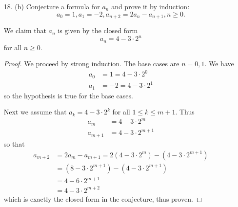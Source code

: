 \documentclass{article}
\begin{document}
\begin{itemize}
\begin{proof}
		\end{proof}

		(b) Show that \[\binom{n}{0} - \binom{n}{1} + \binom{n}{2} - \cdots \pm \binom{n}{n} = 0\] if $n>0.$ 
		\begin{proof}
			We proceed by induction. The base case is $n=1.$ In this case, $\binom{1}{0}-\binom{1}{1}=0$ thus the statement is true for $n=1.$

			Next, assume the hypothesis is true for arbitrary $k\in\NN,$ so that \[0=\sum_{i=1}^k (-1)^i\binom{k}{i}.\] Consider the sums
			\begin{align*}
				S_{k+1} = \sum_{i=0}^{k+1}(-1)^i \binom{k+1}{i} &= \binom{k+1}{0} - \binom{k+1}{1} + \cdots \pm\binom{k+1}{k}\mp\binom{k+1}{k+1} \\
				S_k = \sum_{i=0}^k (-1)^i \binom{k+0}{i} &= \binom{k+0}{0} - \binom{k+0}{1} + \cdots \pm\binom{k+0}{k}
			\end{align*}
			Then 
			\begin{align*}
				S_{k+1} - S_k &= \mp\binom{k+1}{k+1} + \sum_{i=1}^k (-1)^i \binom{k}{i-1} \\
				&= \mp\binom{k}{k}-\sum_{j=0}^{k-1}(-1)^j\binom{k}{j} \\
				&= -\left( \sum_{j=0}^k (-1)^j \binom{k}{j} \right) \\
				&= 0
			\end{align*} so $S_{k+1}=S_k=0,$ completing the proof. 
			
		\end{proof}

	\item[18.] (b) Conjecture a formula for $a_n$ and prove it by induction: \[a_0 = 1, a_1 = -2, a_{n+2} = 2a_n - a_{n+1}, n\ge 0.\]
		\begin{conjecture}
			We claim that $a_n$ is given by the closed form \[a_n=4-3\cdot2^n\] for all $n\ge0.$
		\end{conjecture}

		\begin{proof}
			We proceed by strong induction. The base cases are $n=0, 1.$ We have 
			\begin{align*}
				a_0 &= 1 = 4 - 3\cdot2^0 \\
				a_1 &= -2 = 4 - 3\cdot 2^1
			\end{align*} so the hypothesis is true for the base cases.

			Next we assume that $a_k = 4 - 3\cdot 2^k$ for all $1\le k\le m + 1.$ Thus 
			\begin{align*}
				a_m &= 4 - 3\cdot 2^m \\
				a_{m+1} &= 4 - 3\cdot 2^{m+1}
			\end{align*} so that 
			\begin{align*}
				a_{m+2} &= 2a_m - a_{m+1} = 2(4-3\cdot 2^m) - (4-3\cdot 2^{m+1}) \\
				&= (8 - 3\cdot 2^{m+1}) - (4 - 3\cdot2^{m+1}) \\
				&= 4 - 6\cdot 2^{m+1} \\
				&= 4 - 3\cdot 2^{m+2}
			\end{align*} which is exactly the closed form in the conjecture, thus proven.
			

\end{proof}
\end{itemize}
\end{document}

